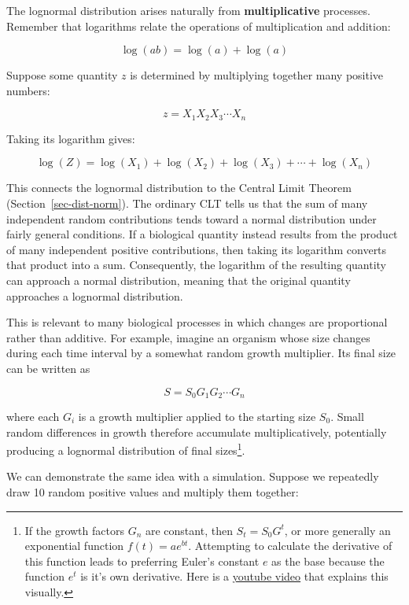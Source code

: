 \documentclass[
  13,
  letterpaper,
]{report}
\begin{document}
The lognormal distribution arises naturally from \textbf{multiplicative}
processes. Remember that logarithms relate the operations of
multiplication and addition:

\[\log\left(ab\right)=\log\left(a\right)+\log\left(a\right)\]

Suppose some quantity \(z\) is determined by multiplying together many
positive numbers:

\[z=X_1X_2X_3\cdots X_n\]

Taking its logarithm gives:

\[\log(Z)=\log(X_1)+\log(X_2)+\log(X_3)+\cdots+\log(X_n)\]

This connects the lognormal distribution to the Central Limit Theorem
(Section~\ref{sec-dist-norm}). The ordinary CLT tells us that the sum of
many independent random contributions tends toward a normal distribution
under fairly general conditions. If a biological quantity instead
results from the product of many independent positive contributions,
then taking its logarithm converts that product into a sum.
Consequently, the logarithm of the resulting quantity can approach a
normal distribution, meaning that the original quantity approaches a
lognormal distribution.

This is relevant to many biological processes in which changes are
proportional rather than additive. For example, imagine an organism
whose size changes during each time interval by a somewhat random growth
multiplier. Its final size can be written as

\[S=S_0G_1G_2\cdots G_n\]

where each \(G_i\) is a growth multiplier applied to the starting size
\(S_0\). Small random differences in growth therefore accumulate
multiplicatively, potentially producing a lognormal distribution of
final sizes\footnote{If the growth factors \(G_n\) are constant, then
  \(S_t=S_0G^t\), or more generally an exponential function
  \(f\left(t\right)=ae^{bt}\). Attempting to calculate the derivative of
  this function leads to preferring Euler's constant \(e\) as the base
  because the function \(e^t\) is it's own derivative. Here is a
  \href{https://www.youtube.com/watch?v=m2MIpDrF7Es}{youtube video} that
  explains this visually.}.

We can demonstrate the same idea with a simulation. Suppose we
repeatedly draw 10 random positive values and multiply them together:
\end{document}
